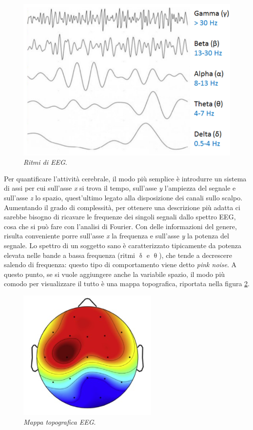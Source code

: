 \documentclass{report}
\newcommand{\figref}[1]{figura \ref{#1}}
\numberwithin{equation}{section}
\numberwithin{figure}{section}
\begin{document}
\begin{figure}[htp]
    \centering
    \includegraphics[scale=0.8]{immagini/ritmi.png}
    \caption{\label{fig:ritmi} \textit{Ritmi di EEG}.}
\end{figure}

Per quantificare l'attività cerebrale, il modo più semplice è introdurre un sistema di assi per cui sull'asse \textit{x} si trova il tempo, sull'asse \textit{y} l'ampiezza del segnale e sull'asse \textit{z} lo spazio, quest'ultimo legato alla disposizione dei canali sullo scalpo. Aumentando il grado di complessità, per ottenere una descrizione più adatta ci sarebbe bisogno di ricavare le frequenze dei singoli segnali dallo spettro EEG, cosa che si può fare con l'analisi di Fourier. Con delle informazioni del genere, risulta conveniente porre sull'asse \textit{x} la frequenza e sull'asse \textit{y} la potenza del segnale. Lo spettro di un soggetto sano è caratterizzato tipicamente da potenza elevata nelle bande a bassa frequenza (ritmi $\updelta$ e $\uptheta$), che tende a decrescere salendo di frequenza: questo tipo di comportamento viene detto \textit{pink noise}. A questo punto, se si vuole aggiungere anche la variabile spazio, il modo più comodo per visualizzare il tutto è una mappa topografica, riportata nella \figref{fig:mappa}.

\begin{figure}[htp]
    \centering
    \includegraphics[scale=0.8]{immagini/mappa.png}
    \caption{\label{fig:mappa} \textit{Mappa topografica EEG}.}
\end{figure}
\end{document}
